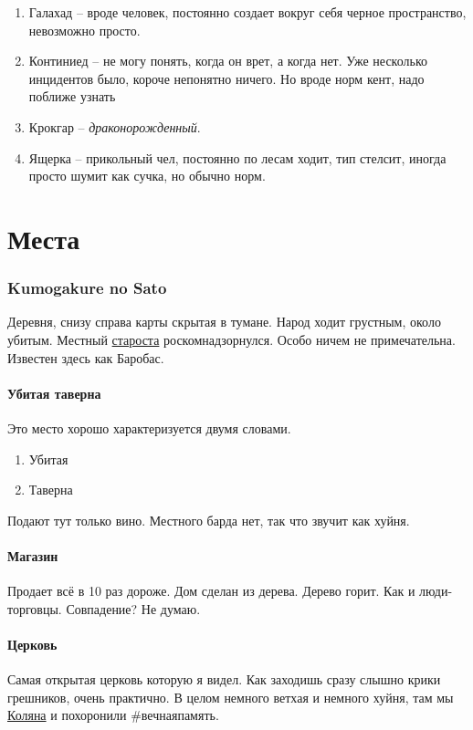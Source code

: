 \documentclass[letterpaper,twocolumn,openany,nodeprecatedcode]{dndbook}
\begin{document}
\begin{enumerate}
    \item Галахад -- вроде человек, постоянно создает вокруг себя черное пространство, невозможно просто.
    \item Континиед -- не могу понять, когда он врет, а когда нет. Уже несколько инцидентов было, короче непонятно ничего. Но вроде норм кент, надо поближе узнать
    \item Крокгар -- \textit{драконорожденный}.
    \item Ящерка -- прикольный чел, постоянно по лесам ходит, тип стелсит, иногда просто шумит как сучка, но обычно норм. 
\end{enumerate}

\part{Места}

\section{Kumogakure no Sato}\label{sec:vilage}

Деревня, снизу справа карты скрытая в тумане. Народ ходит грустным, около убитым. Местный \hyperref[sec:kolyan_indirovich]{староста} роскомнадзорнулся.
Особо ничем не примечательна. Известен здесь как Баробас.

\subsection{Убитая таверна}\label{sec:vilage:tavern}
Это место хорошо характеризуется двумя словами.
\begin{enumerate}
    \item Убитая
    \item Таверна
\end{enumerate}

Подают тут только вино. Местного барда нет, так что звучит как хуйня.

\subsection{Магазин}\label{sec:vilage:shop}

Продает всё в 10 раз дороже. Дом сделан из дерева. Дерево горит. Как и люди-торговцы. Совпадение? Не думаю.

\subsection{Церковь}
Самая открытая церковь которую я видел. Как заходишь сразу слышно крики грешников, очень практично. 
В целом немного ветхая и немного хуйня, там мы \hyperref[sec:kolyan_indirovich]{Коляна} и похоронили \#вечнаяпамять.
\end{document}
